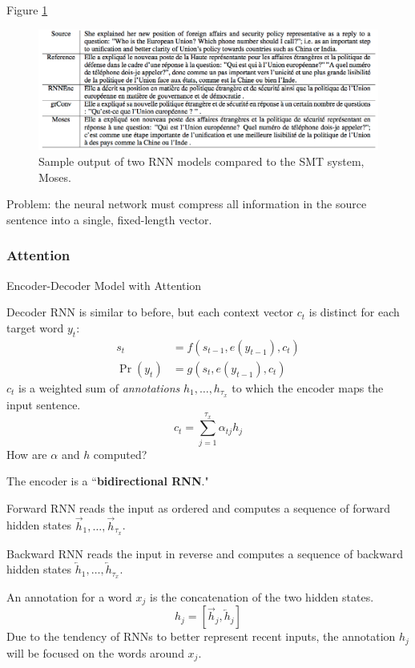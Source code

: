 \documentclass[english]{article}
\begin{document}
 

\item   Figure \ref{Sample-rnn}

\begin{figure}
\centering
\includegraphics[height=0.35\linewidth]{sample-sents.png}
\caption{Sample output of two RNN models compared to the SMT system, Moses.}
\label{Sample-rnn}
\end{figure}
Problem: the neural network must compress all information in the source sentence into a single, fixed-length vector.
 \eenum

\subsubsection{Attention}
\benum
\item 
 {Encoder-Decoder Model with Attention}

Decoder RNN is similar to before, but each context vector $c_t$ is distinct for each target word $y_t$:
\begin{align*}
s_t &= f(s_{t-1}, e(y_{t-1}), c_t)\\
\Pr(y_t) &= g(s_t, e(y_{t-1}), c_t)
\end{align*}
$c_t$ is a weighted sum of \textit{annotations} $h_1,\dots,h_{\tau_x}$ to which the encoder maps the input sentence.
$$c_t = \sum_{j=1}^{\tau_x} \alpha_{tj}h_j$$
How are $\alpha$ and $h$ computed?
 

\item 
The encoder is a ``\textbf{bidirectional RNN}."
 
Forward RNN reads the input as ordered and computes a sequence of forward hidden states $\overrightarrow{h}_1,\dots,\overrightarrow{h}_{\tau_x}$.
 
Backward RNN reads the input in reverse and computes a sequence of backward hidden states $\overleftarrow{h}_1,\dots,\overleftarrow{h}_{\tau_x}$.
 
An annotation for a word $x_j$ is the concatenation of the two hidden states.
$$h_j=\left[\overrightarrow{h}_j, \overleftarrow{h}_j\right]$$
Due to the tendency of RNNs to better represent recent inputs, the annotation $h_j$ will be focused on the words around $x_j$.
 
\end{document}
